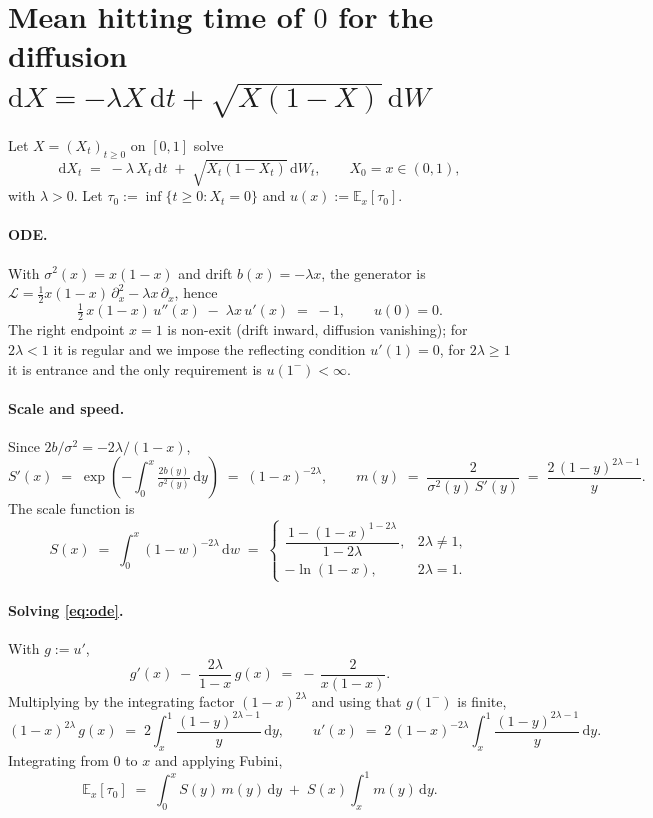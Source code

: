 \documentclass[11pt]{article}
\begin{document}
\section*{Mean hitting time of $0$ for the diffusion
$\mathrm{d}X = -\lambda X\,\mathrm{d}t + \sqrt{X(1-X)}\,\mathrm{d}W$}

Let $X = (X_t)_{t \ge 0}$ on $[0,1]$ solve
\[
  \mathrm{d}X_t \;=\; -\lambda\,X_t\,\mathrm{d}t \;+\; \sqrt{X_t(1-X_t)}\,\mathrm{d}W_t,
  \qquad X_0 = x \in (0,1),
\]
with $\lambda > 0$. Let $\tau_0 := \inf\{t \ge 0 : X_t = 0\}$ and
$u(x) := \mathbb{E}_x[\tau_0]$.

\paragraph{ODE.} With $\sigma^2(x)=x(1-x)$ and drift $b(x)=-\lambda x$, the generator
is $\mathcal{L} = \tfrac12 x(1-x)\,\partial_x^2 - \lambda x\,\partial_x$, hence
\begin{equation}\label{eq:ode}
  \tfrac12\, x(1-x)\, u''(x) \;-\; \lambda x\, u'(x) \;=\; -1,
  \qquad u(0)=0.
\end{equation}
The right endpoint $x=1$ is non-exit (drift inward, diffusion vanishing); for
$2\lambda<1$ it is regular and we impose the reflecting condition $u'(1)=0$, for
$2\lambda\ge 1$ it is entrance and the only requirement is $u(1^-) <\infty$.

\paragraph{Scale and speed.} Since $2b/\sigma^2 = -2\lambda/(1-x)$,
\[
  S'(x) \;=\; \exp\!\left(-\!\int_0^x \tfrac{2b(y)}{\sigma^2(y)}\,\mathrm{d}y\right)
         \;=\; (1-x)^{-2\lambda},
  \qquad
  m(y) \;=\; \frac{2}{\sigma^2(y)\,S'(y)}
         \;=\; \frac{2\,(1-y)^{2\lambda-1}}{y}.
\]
The scale function is
\[
  S(x) \;=\; \int_0^x (1-w)^{-2\lambda}\,\mathrm{d}w \;=\;
  \begin{cases}
    \dfrac{\,1 - (1-x)^{1-2\lambda}\,}{1-2\lambda}, & 2\lambda \neq 1, \\[1.2ex]
    -\ln(1-x), & 2\lambda = 1.
  \end{cases}
\]

\paragraph{Solving \eqref{eq:ode}.} With $g := u'$,
\[
  g'(x) \;-\; \frac{2\lambda}{1-x}\,g(x) \;=\; -\,\frac{2}{x(1-x)}.
\]
Multiplying by the integrating factor $(1-x)^{2\lambda}$ and using that
$g(1^-)$ is finite,
\[
  (1-x)^{2\lambda}\,g(x)
  \;=\; 2\int_x^1 \frac{(1-y)^{2\lambda-1}}{y}\,\mathrm{d}y,
  \qquad
  u'(x) \;=\; 2\,(1-x)^{-2\lambda}\!\int_x^1 \frac{(1-y)^{2\lambda-1}}{y}\,\mathrm{d}y.
\]
Integrating from $0$ to $x$ and applying Fubini,
\begin{equation}\label{eq:result}
  \boxed{\;
    \mathbb{E}_x[\tau_0]
    \;=\;
    \int_0^x S(y)\,m(y)\,\mathrm{d}y
    \;+\;
    S(x)\int_x^1 m(y)\,\mathrm{d}y.
  \;}
\end{equation}
\end{document}
